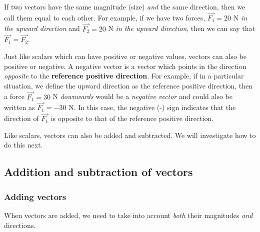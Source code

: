 If two vectors have the same magnitude (size) \textit{and} the same direction, then we call them equal to each other. For example, if we have two forces,  $\stackrel{\to }{F_{1}} = 20$ N \textit{in the upward direction} and $\stackrel{\to }{F_{2}} = 20$ N \textit{in the upward direction}, then we can say that $\stackrel{\to }{F_{1}} = \stackrel{\to }{F_{2}}$.



Just like scalars which can have positive or negative values, vectors can also be positive or negative. 
A negative vector is a vector which points in the direction \textit{opposite} to the \textbf{reference positive direction}. 
For example, if in a particular situation, we define the upward direction as the reference positive direction, then a force $\stackrel{\to }{F_{1}} = 30$ N \textit{downwards} would be a \textit{negative vector} and could also be written as $\stackrel{\to }{F_{1}} = -30$ N. In this case, the negative (-) sign indicates that the direction of $\stackrel{\to }{F_{1}}$ is opposite to that of the reference positive direction.


Like scalars, vectors can also be added and subtracted. We will investigate how to do this next.

\label{m38813*uid35}
\subsection*{Addition and subtraction of vectors}
            \nopagebreak
        \label{m38813*id188304}

\subsubsection{Adding vectors}
When vectors are added, we need to take into account \textit{both} their magnitudes \textit{and} directions. 


